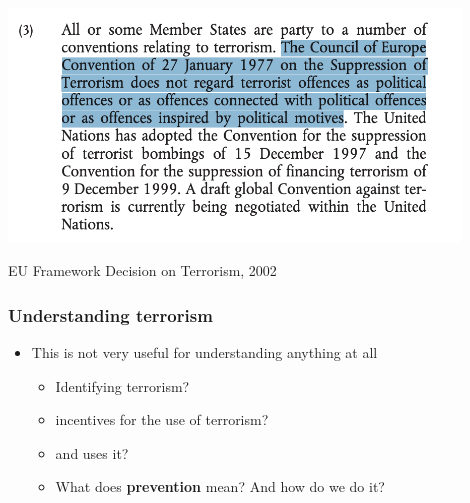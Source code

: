 \documentclass[aspectratio=43]{beamer}
\begin{document}
\begin{frame}
\frametitle{}
\centering

\includegraphics[width = 0.9\textwidth]{img/eu_law}

EU Framework Decision on Terrorism, 2002

\end{frame}

\begin{frame}
\frametitle{Understanding terrorism}
\centering

\begin{itemize}
  \item[] This is not very useful for understanding anything at all
  \begin{itemize}
    \item<2-> Identifying terrorism?
    \item<3->  incentives for the use of terrorism?
    \item<4-> {\color{red}{Who}} and {\color{red}{when}} uses it?
    \item<5-> What does \textbf{prevention} mean? And how do we do it?
  \end{itemize}
\end{itemize}

\end{frame}

\end{document}
